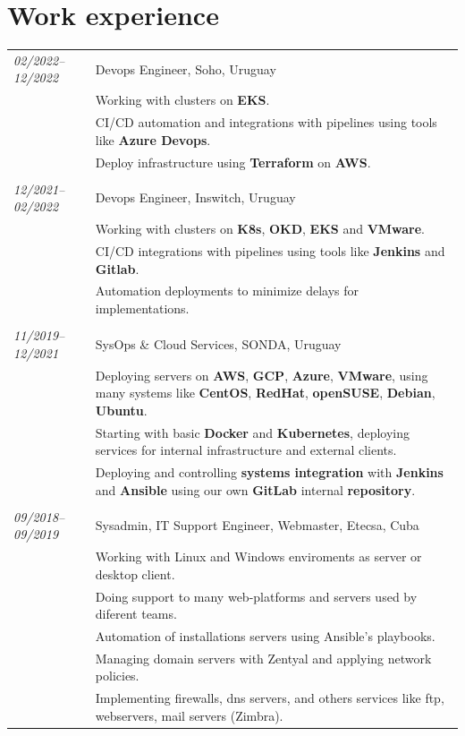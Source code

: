 \documentclass[a4paper,12pt]{article}
\begin{document}
\section{Work experience}
\begin{tabular}{p{2.9cm}| p{16cm}}
\emph{02/2022–12/2022} & Devops Engineer, Soho, Uruguay \\
\textsc{}&\footnotesize{Working with clusters on \textbf{EKS}.}\\
\textsc{}&\footnotesize{CI/CD automation and integrations with pipelines using tools like \textbf{Azure Devops}.}\\
\textsc{}&\footnotesize{Deploy infrastructure using \textbf{Terraform} on \textbf{AWS}.}\\

\multicolumn{2}{c}{} \\  
\emph{12/2021–02/2022} & Devops Engineer, Inswitch, Uruguay \\
\textsc{}&\footnotesize{Working with clusters on \textbf{K8s}, \textbf{OKD}, \textbf{EKS} and \textbf{VMware}.}\\
\textsc{}&\footnotesize{CI/CD integrations with pipelines using tools like \textbf{Jenkins} and \textbf{Gitlab}.}\\
\textsc{}&\footnotesize{Automation deployments to minimize delays for implementations.}\\

\multicolumn{2}{c}{} \\  
\emph{11/2019–12/2021} & SysOps \& Cloud Services, SONDA, Uruguay \\
\textsc{}&\footnotesize{Deploying servers on \textbf{AWS}, \textbf{GCP}, \textbf{Azure}, \textbf{VMware}, using many systems like \textbf{CentOS}, \textbf{RedHat}, \textbf{openSUSE}, \textbf{Debian}, \textbf{Ubuntu}.}\\
\textsc{}&\footnotesize{Starting with basic \textbf{Docker} and \textbf{Kubernetes}, deploying services for internal infrastructure and external clients.}\\
\textsc{}&\footnotesize{Deploying and controlling \textbf{systems integration} with \textbf{Jenkins} and \textbf{Ansible} using our own \textbf{GitLab} internal \textbf{repository}.}\\

\multicolumn{2}{c}{} \\  
\emph{09/2018–09/2019} & Sysadmin, IT Support Engineer, Webmaster, Etecsa, Cuba\\
\textsc{}&\footnotesize{Working with Linux and Windows enviroments as server or desktop client.}\\
\textsc{}&\footnotesize{Doing support to many web-platforms and servers used by diferent teams.}\\
\textsc{}&\footnotesize{Automation of installations servers using Ansible's playbooks.}\\
\textsc{}&\footnotesize{Managing domain servers with Zentyal and applying network policies.}\\
\textsc{}&\footnotesize{Implementing firewalls, dns servers, and others services like ftp, webservers, mail servers (Zimbra).}\\


\end{tabular}
\end{document}
